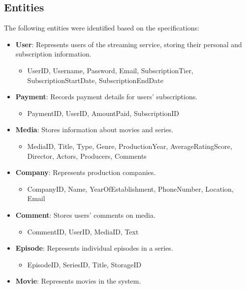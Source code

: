 \documentclass[13pt]{article}
\begin{document}
\subsection{Entities}
The following entities were identified based on the specifications:
\begin{itemize}
    \item \textbf{User}: Represents users of the streaming service, storing their personal and subscription information.
        \begin{itemize}
            \item UserID, Username, Password, Email, SubscriptionTier, SubscriptionStartDate, SubscriptionEndDate
        \end{itemize}
    \item \textbf{Payment}: Records payment details for users' subscriptions.
        \begin{itemize}
            \item PaymentID, UserID, AmountPaid, SubscriptionID
        \end{itemize}
    \item \textbf{Media}: Stores information about movies and series.
        \begin{itemize}
            \item MediaID, Title, Type, Genre, ProductionYear, AverageRatingScore, Director, Actors, Producers, Comments
        \end{itemize}
    \item \textbf{Company}: Represents production companies.
        \begin{itemize}
            \item CompanyID, Name, YearOfEstablishment, PhoneNumber, Location, Email
        \end{itemize}
    \item \textbf{Comment}: Stores users' comments on media.
        \begin{itemize}
            \item CommentID, UserID, MediaID, Text
        \end{itemize}
    \item \textbf{Episode}: Represents individual episodes in a series.
        \begin{itemize}
            \item EpisodeID, SeriesID, Title, StorageID
        \end{itemize}
    \item \textbf{Movie}: Represents movies in the system.
        \begin{itemize}

\end{itemize}
\end{itemize}
\end{document}
